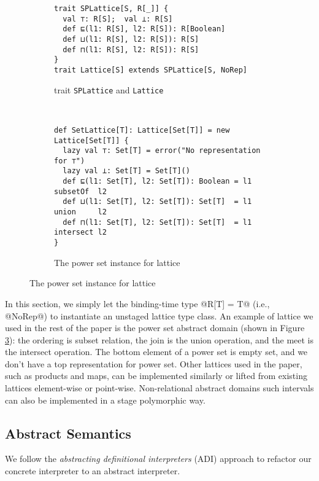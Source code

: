 \begin{figure}[h!]
  \centering
  \begin{subfigure}[b]{0.45\textwidth}
  \begin{lstlisting}[style=small]
trait SPLattice[S, R[_]] {
  val ⊤: R[S];  val ⊥: R[S]
  def ⊑(l1: R[S], l2: R[S]): R[Boolean]
  def ⊔(l1: R[S], l2: R[S]): R[S]
  def ⊓(l1: R[S], l2: R[S]): R[S]
}
trait Lattice[S] extends SPLattice[S, NoRep]
  \end{lstlisting}
  \caption{trait \texttt{SPLattice} and \texttt{Lattice}} \label{fig:splattice}
  \end{subfigure}
  ~
  \begin{subfigure}[b]{0.6\textwidth}
\begin{lstlisting}[style=small]
def SetLattice[T]: Lattice[Set[T]] = new Lattice[Set[T]] {
  lazy val ⊤: Set[T] = error("No representation for ⊤")
  lazy val ⊥: Set[T] = Set[T]()
  def ⊑(l1: Set[T], l2: Set[T]): Boolean = l1 subsetOf  l2
  def ⊔(l1: Set[T], l2: Set[T]): Set[T]  = l1 union     l2
  def ⊓(l1: Set[T], l2: Set[T]): Set[T]  = l1 intersect l2
}
\end{lstlisting}
  \caption{The power set instance for lattice} \label{fig:powerset}
\end{subfigure}
\end{figure}

In this section, we simply let the binding-time type @R[T] = T@ (i.e., @NoRep@)
to instantiate an unstaged lattice type class. An example of lattice we used in
the rest of the paper is the power set abstract domain (shown in Figure
\ref{fig:powerset}): the ordering is subset relation, the join is the union
operation, and the meet is the intersect operation. The bottom element of a
power set is empty set, and we don't have a top representation for power set.
Other lattices used in the paper, such as products and maps, can be
implemented similarly or lifted from existing lattices element-wise or
point-wise. Non-relational abstract domains such intervals can also be
implemented in a stage polymorphic way.

\subsection{Abstract Semantics}

We follow the \textit{abstracting definitional interpreters} (ADI) approach
\cite{DBLP:journals/pacmpl/DaraisLNH17} to refactor our concrete interpreter to
an abstract interpreter.

